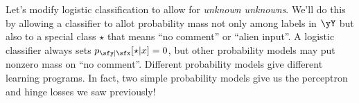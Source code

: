 




  \newpage
{}
  Let's modify logistic classification to allow for \emph{unknown
  unknowns}. We'll do this by allowing a classifier to allot probability
  mass not only among labels in $\yY$ but also to a special class $\star$
  that means ``no comment'' or ``alien input''.  A logistic classifier
  always sets $p_{\sfy|\sfx}[\star|x] = 0$, but
  other probability models may put nonzero mass on ``no comment''.
  Different probability models give different learning programs.
  In fact, two simple probability models give us the perceptron and hinge
  losses we saw previously!
  \newcommand{\zp}{\oplus}%
  \newcommand{\zm}{\ominus}%
